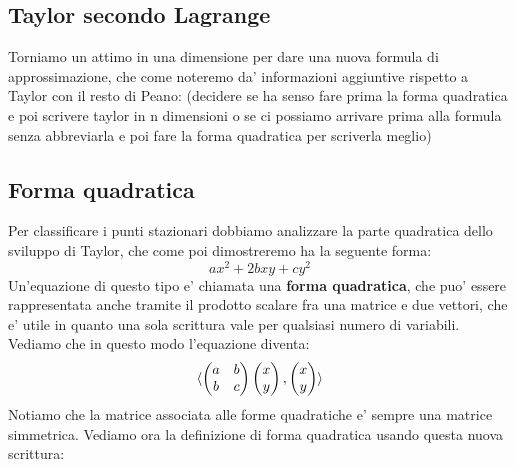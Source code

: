 \documentclass{report}
\begin{document}
\subsection{Taylor secondo Lagrange}
Torniamo un attimo in una dimensione per dare una nuova formula di approssimazione, che come noteremo da' informazioni aggiuntive rispetto a Taylor con il resto di Peano:
(decidere se ha senso fare prima la forma quadratica e poi scrivere taylor in n dimensioni o se ci possiamo arrivare prima alla formula senza abbreviarla e poi fare la forma quadratica per scriverla meglio)
\subsection{Forma quadratica}
Per classificare i punti stazionari dobbiamo analizzare la parte quadratica dello sviluppo di Taylor, che come poi dimostreremo ha la seguente forma:
\[
ax^2 + 2bxy + cy^2
\]
Un'equazione di questo tipo e' chiamata una \textbf{forma quadratica}, che puo' essere rappresentata anche tramite il prodotto scalare fra una matrice e due vettori, che e' utile in quanto una sola scrittura vale per qualsiasi numero di variabili. Vediamo che in questo modo l'equazione diventa:
\[
  \langle \begin{pmatrix}
  a & b\\
  b & c\\
  \end{pmatrix}\begin{pmatrix}
  x\\
  y\\
  \end{pmatrix}, \begin{pmatrix}
  x\\
  y\\
  \end{pmatrix} \rangle
\]
Notiamo che la matrice associata alle forme quadratiche e' sempre una matrice simmetrica. Vediamo ora la definizione di forma quadratica usando questa nuova scrittura:
\end{document}
